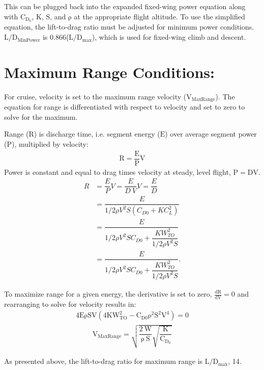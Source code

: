 \documentclass{achemso}
\begin{document}
This can be plugged back into the expanded fixed-wing power equation along with $\mathrm{C_{D_0}}$, $\mathrm{K}$, $\mathrm{S}$, and $\mathrm{\rho}$ at the appropriate flight altitude. To use the simplified equation, the lift-to-drag ratio must be adjusted for minimum power conditions. $\mathrm{{L}/{D}_{MinPower}}$ is 0.866($\mathrm{{L}/{D}_{max}}$), which is used for fixed-wing climb and descent. \cite{Raymer}

\vspace{-0.5cm}
\section*{Maximum Range Conditions:}
\vspace{-0.5cm}
For cruise, velocity is set to the maximum range velocity ($\mathrm{V_{Max Range}}$). The equation for range is differentiated with respect to velocity and set to zero to solve for the maximum. 

Range ($\mathrm{R}$) is discharge time, i.e. segment energy ($\mathrm{E}$) over average segment power ($\mathrm{P}$), multiplied by velocity:
\begin{gather*}
\mathrm{R = \dfrac{E}{P} V}
\end{gather*}
Power is constant and equal to drag times velocity at steady, level flight\cite{Raymer}, $\mathrm{P = DV}$.
\begin{align*}
R & = \dfrac{E}{P} V = \dfrac{E}{D\ V} V = \dfrac{E}{D}\\
  &=\dfrac{E}{1/2 \rho V^2 S (C_{D0} + K C_L^2)}\\
       &= \dfrac{E}{1/2 \rho V^2 S C_{D0} + \dfrac{K W_{TO}^2}{1/2 \rho V^2 S}}\\
       &= \dfrac{E}{1/2 \rho V^2 S C_{D0} + \dfrac{K W_{TO}^2}{1/2 \rho V^2 S}}.
\end{align*}

To maximize range for a given energy, the derivative is set to zero, $\mathrm{\frac{dR}{dV} = 0}$ and rearranging to solve for velocity results in:
\begin{gather*}
\mathrm{4 E \rho S V (4 K W_{TO}^2 - C_{D0} \rho^2 S^2 V^4) = 0}
\end{gather*}
\begin{gather*}
    \mathrm{V_{Max Range} = \sqrt{\dfrac{2\ W}{\rho\ S}\sqrt{\dfrac{K}{C_{D_0}}}}}
    \label{eqn:maxrange}
\end{gather*}  

As presented above, the lift-to-drag ratio for maximum range is $\mathrm{{L}/{D}_{max}}$, 14.
\vspace{-0.5cm}
\end{document}
